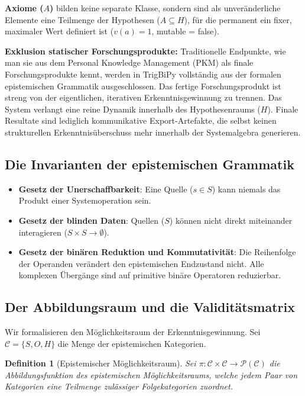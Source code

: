 \documentclass[11pt, a4paper]{article}
\newtheorem{definition}{Definition}
\begin{document}
	\textbf{Axiome ($A$)} bilden keine separate Klasse, sondern sind als unveränderliche Elemente eine Teilmenge der Hypothesen ($A \subseteq H$), für die permanent ein fixer, maximaler Wert definiert ist ($v(a) = 1$, mutable = false).
	
	\textbf{Exklusion statischer Forschungsprodukte:} Traditionelle Endpunkte, wie man sie aus dem Personal Knowledge Management (PKM) als finale Forschungsprodukte kennt, werden in TrigBiPy vollständig aus der formalen epistemischen Grammatik ausgeschlossen. Das fertige Forschungsprodukt ist streng von der eigentlichen, iterativen Erkenntnisgewinnung zu trennen. Das System verlangt eine reine Dynamik innerhalb des Hypothesenraums ($H$). Finale Resultate sind lediglich kommunikative Export-Artefakte, die selbst keinen strukturellen Erkenntnisüberschuss mehr innerhalb der Systemalgebra generieren.
	
	\subsection{Die Invarianten der epistemischen Grammatik}
	\begin{itemize}
		\item \textbf{Gesetz der Unerschaffbarkeit}: Eine Quelle ($s \in S$) kann niemals das Produkt einer Systemoperation sein.
		\item \textbf{Gesetz der blinden Daten}: Quellen ($S$) können nicht direkt miteinander interagieren ($S \times S \to \emptyset$).
		\item \textbf{Gesetz der binären Reduktion und Kommutativität}: Die Reihenfolge der Operanden verändert den epistemischen Endzustand nicht. Alle komplexen Übergänge sind auf primitive binäre Operatoren reduzierbar.
	\end{itemize}
	
	\subsection{Der Abbildungsraum und die Validitätsmatrix}
	Wir formalisieren den Möglichkeitsraum der Erkenntnisgewinnung. Sei $\mathcal{C} = \{S, O, H\}$ die Menge der epistemischen Kategorien.
	
	\begin{definition}[Epistemischer Möglichkeitsraum]
		Sei $\pi: \mathcal{C} \times \mathcal{C} \to \mathcal{P}(\mathcal{C})$ die Abbildungsfunktion des epistemischen Möglichkeitsraums, welche jedem Paar von Kategorien eine Teilmenge zulässiger Folgekategorien zuordnet.
	\end{definition}
	
\end{document}
